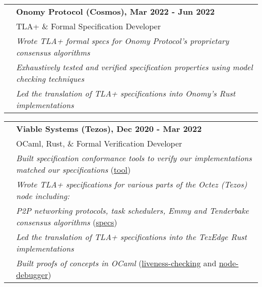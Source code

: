 \documentclass[letterpaper,10pt,oneside]{article}
\begin{document}
\vfill


\noindent \begin{tabular}{@{} l l}
 \hspace{1.1in} & \textbf{Onomy Protocol (Cosmos), Mar 2022 - Jun 2022} \\
 & TLA+ \& Formal Specification Developer \\
 & \emph{Wrote TLA+ formal specs for Onomy Protocol's proprietary consensus algorithms} \\
 & \emph{Exhaustively tested and verified specification properties using model checking techniques} \\
 & \emph{Led the translation of TLA+ specifications into Onomy's Rust implementations} \\
\end{tabular}

\vfill


\noindent \begin{tabular}{@{} l l}
 \hspace{1.1in} & \textbf{Viable Systems (Tezos), Dec 2020 - Mar 2022} \\
 & OCaml, Rust, \& Formal Verification Developer \\
 & \emph{Built specification conformance tools to verify our implementations matched our specifications} (\href{https://github.com/Isaac-DeFrain?tab=repositories&q=&type=&language=tla&sort=}{tool}) \\
 & \emph{Wrote TLA+ specifications for various parts of the Octez (Tezos) node including:} \\
 & \emph{P2P networking protocols, task schedulers, Emmy and Tenderbake consensus algorithms} (\href{https://github.com/tezedge/tezedge-specification}{specs}) \\
 & \emph{Led the translation of TLA+ specifications into the TezEdge Rust implementations} \\
 & \emph{Built proofs of concepts in OCaml} (\href{https://github.com/Isaac-DeFrain/liveness-checking}{liveness-checking} and \href{https://github.com/Isaac-DeFrain/node-debugger}{node-debugger}) \\
\end{tabular}

\vfill

\end{document}
